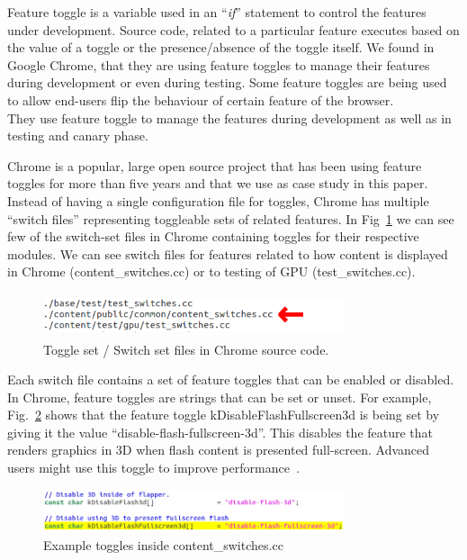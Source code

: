 \documentclass[conference]{IEEEtran}
\begin{document}
Feature toggle is a variable used in an ``\textit{if}'' statement to control the 
features under development. Source code, related to a particular feature executes 
based on the value of a toggle or the presence/absence of the toggle itself. 
We found in Google Chrome, that they are using feature toggles to manage their 
features during development or even during testing. Some feature toggles are 
being used to allow end-users flip the behaviour of certain feature of the browser.\\

They use feature toggle to manage the features during development as well as 
in testing and canary phase.

Chrome is a popular, large open source project that has been using feature toggles for more than five years and that we use as case study in this paper. 
Instead of having a single configuration file for toggles, Chrome has 
multiple “switch files” representing toggleable sets of related features. 
In Fig~\ref{fig:switch-sets} we can see few of the switch-set files 
in Chrome containing toggles for their respective modules. 
We can see switch files for features related to how content is 
displayed in Chrome (content\_switches.cc) or to testing of GPU 
(test\_switches.cc).
\begin{figure}
\includegraphics[height=0.5in,width=3.5in]{figure/switches.png}
\caption{Toggle set / Switch set files in Chrome source code.}
\label{fig:switch-sets}
\end{figure}
Each switch file contains a set of feature toggles that can
be enabled or disabled. In Chrome, feature toggles are strings
that can be set or unset. For example, Fig.~\ref{fig:content-toggles} 
shows that the
feature toggle kDisableFlashFullscreen3d is being set by
giving it the value “disable-flash-fullscreen-3d”. This disables
the feature that renders graphics in 3D when flash content is
presented full-screen. Advanced users might use this toggle
to improve performance~\cite{kDisableFlashFullscreen3d}.\\
\begin{figure}
\includegraphics[height=0.5in,width=3.5in]{figure/toggleassigned.png}
\caption{Example toggles inside content\_switches.cc}
\label{fig:content-toggles}
\end{figure}
\end{document}
